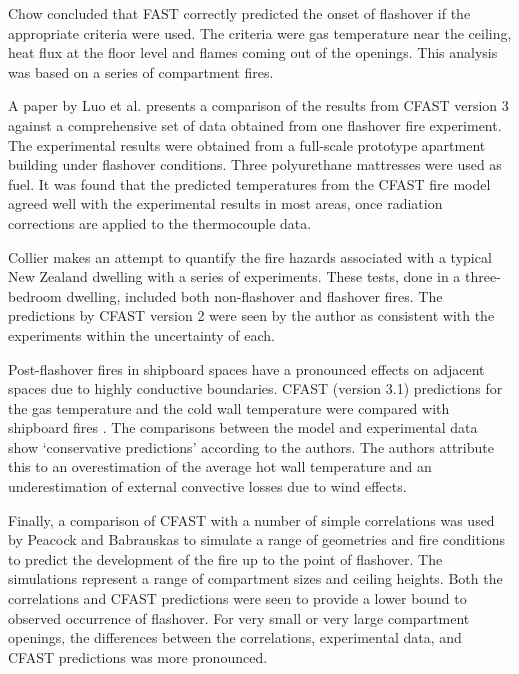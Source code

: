 Chow \cite{Valid:Chow_Flashover} concluded that FAST correctly predicted the onset of flashover if the appropriate criteria were used. The criteria were gas temperature near the ceiling, heat flux at the floor level and flames coming out of the openings. This analysis was based on a series of compartment
fires.

A paper by Luo et al. \cite{Valid:Luo_Flashover} presents a comparison of the results from CFAST version 3 against a comprehensive set of data obtained from one flashover fire experiment. The experimental results were obtained from a full-scale prototype apartment building under flashover conditions. Three polyurethane mattresses were used as fuel. It was found that the predicted temperatures from the CFAST fire model agreed well with the experimental results in most areas, once radiation corrections are applied to the thermocouple data.

Collier \cite{Valid:Collier} makes an attempt to quantify the fire hazards associated with a typical New Zealand dwelling with a series of experiments. These tests, done in a three-bedroom dwelling, included both non-flashover and flashover fires. The predictions by CFAST version 2 were seen by the author as consistent with the experiments within the uncertainty of each.

Post-flashover fires in shipboard spaces have a pronounced effects on adjacent spaces due to highly conductive boundaries. CFAST (version 3.1) predictions for the gas temperature and the cold wall temperature were compared with shipboard fires \cite{Valid:White}. The comparisons between the model and experimental data show `conservative predictions' according to the authors. The authors attribute this to an overestimation of the average hot wall temperature and an underestimation of external convective losses due to wind effects.

Finally, a comparison of CFAST with a number of simple correlations was used by Peacock and Babrauskas \cite{Valid:Peacock_Flashover_1,Valid:Peacock_Flashover_2} to simulate a range of geometries and fire conditions to predict the development of the fire up to the point of flashover. The simulations represent a range of compartment sizes and ceiling heights. Both the correlations and CFAST predictions were seen to provide a lower bound to observed occurrence of flashover. For very small or very large compartment openings, the differences between the correlations, experimental data, and CFAST predictions was more pronounced.


